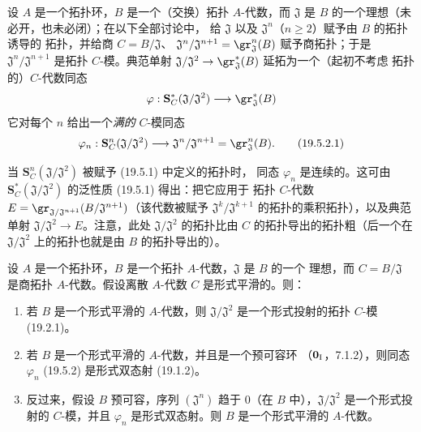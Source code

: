 \begin{env}[19.5.2]
\label{0.19.5.2-fr}
设 $A$ 是一个拓扑环，$B$ 是一个（交换）拓扑 $A$-代数，而
$\mathfrak J$ 是 $B$ 的一个理想（未必开，也未必闭）；在以下全部讨论中，
给 $\mathfrak J$ 以及 $\mathfrak J^n$（$n\geq2$）赋予由 $B$ 的拓扑诱导的
拓扑，并给商
$C=B/\mathfrak J$、
$\mathfrak J^n/\mathfrak J^{n+1}=\gr_{\mathfrak J}^n(B)$ 赋予商拓扑；于是
$\mathfrak J^n/\mathfrak J^{n+1}$ 是拓扑 $C$-模。典范单射
$\mathfrak J/\mathfrak J^2\to\gr_{\mathfrak J}^*(B)$ 延拓为一个（起初不考虑
拓扑的）$C$-代数同态
\[
  \varphi:\mathbf S_C^*(\mathfrak J/\mathfrak J^2)
  \longrightarrow\gr_{\mathfrak J}^*(B)
\]
它对每个 $n$ 给出一个\emph{满的} $C$-模同态
\begin{equation}
\label{0.19.5.2.1-fr}
  \varphi_n:\mathbf S_C^n(\mathfrak J/\mathfrak J^2)
  \longrightarrow\mathfrak J^n/\mathfrak J^{n+1}
  =\gr_{\mathfrak J}^n(B).
  \tag{19.5.2.1}
\end{equation}


当 $\mathbf S_C^n(\mathfrak J/\mathfrak J^2)$ 被赋予 (19.5.1) 中定义的拓扑时，
同态 $\varphi_n$ 是连续的。这可由
$\mathbf S_C^*(\mathfrak J/\mathfrak J^2)$ 的泛性质 (19.5.1) 得出：把它应用于
拓扑 $C$-代数
$E=\gr_{\mathfrak J/\mathfrak J^{n+1}}(B/\mathfrak J^{n+1})$（该代数被赋予
$\mathfrak J^k/\mathfrak J^{k+1}$ 的拓扑的乘积拓扑），以及典范单射
$\mathfrak J/\mathfrak J^2\to E$。注意，此处 $\mathfrak J/\mathfrak J^2$
的拓扑比由 $C$ 的拓扑导出的拓扑粗（后一个在
$\mathfrak J/\mathfrak J^2$ 上的拓扑也就是由 $B$ 的拓扑导出的）。
\end{env}

\begin{theorem}[19.5.3]
\label{0.19.5.3-fr}
设 $A$ 是一个拓扑环，$B$ 是一个拓扑 $A$-代数，$\mathfrak J$ 是 $B$ 的一个
理想，而 $C=B/\mathfrak J$ 是商拓扑 $A$-代数。假设离散 $A$-代数 $C$
是形式平滑的。则：
\begin{enumerate}
  \item[\rm(i)] 若 $B$ 是一个形式平滑的 $A$-代数，则
  $\mathfrak J/\mathfrak J^2$ 是一个形式投射的拓扑 $C$-模 (19.2.1)。
  \item[\rm(ii)] 若 $B$ 是一个形式平滑的 $A$-代数，并且是一个预可容环
  （$\mathbf 0_{\rm I}$，7.1.2），则同态 $\varphi_n$ (19.5.2) 是形式双态射
  (19.1.2)。
  \item[\rm(iii)] 反过来，假设 $B$ 预可容，序列 $(\mathfrak J^n)$ 趋于
  $0$（在 $B$ 中），$\mathfrak J/\mathfrak J^2$ 是一个形式投射的 $C$-模，并且
  $\varphi_n$ 是形式双态射。则 $B$ 是一个形式平滑的 $A$-代数。
\end{enumerate}
\end{theorem}

